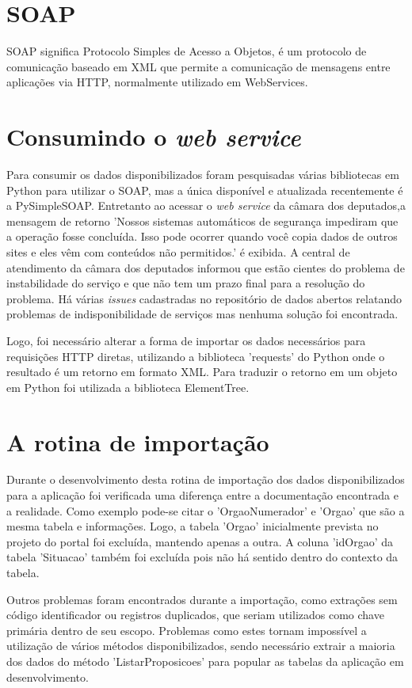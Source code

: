 \documentclass[
	12pt,				%
	openright,			%
	twoside,			%
	a4paper,			%
	english,			%
	french,				%
	spanish,			%
	brazil				%
	]{abntex2}
\begin{document}
\section{SOAP}
SOAP significa Protocolo Simples de Acesso a Objetos, é um protocolo de comunicação baseado em XML que permite a comunicação de mensagens entre aplicações via HTTP, normalmente utilizado em WebServices.

\section{Consumindo o \emph{web service}}
Para consumir os dados disponibilizados foram pesquisadas várias bibliotecas em Python para utilizar o SOAP, mas a única disponível
e atualizada recentemente é a PySimpleSOAP. Entretanto ao acessar o \emph{web service} da câmara dos deputados,a mensagem de retorno 'Nossos sistemas automáticos de segurança impediram que a operação fosse concluída.
Isso pode ocorrer quando você copia dados de outros sites e eles vêm com conteúdos não permitidos.' é exibida. A central de atendimento da câmara dos deputados informou que estão
cientes do problema de instabilidade do serviço e que não tem um prazo final para a resolução do problema. Há várias \emph{issues} cadastradas 
no repositório de dados abertos relatando problemas de indisponibilidade de serviços mas nenhuma solução foi encontrada.

Logo, foi necessário alterar a forma de importar os dados necessários para requisições HTTP diretas, utilizando a biblioteca 'requests' do Python onde o resultado é um retorno em formato XML. Para traduzir
o retorno em um objeto em Python foi utilizada a biblioteca ElementTree.

\section{A rotina de importação}
Durante o desenvolvimento desta rotina de importação dos dados disponibilizados para a aplicação foi verificada 
uma diferença entre a documentação encontrada e a realidade. Como exemplo pode-se citar o 'OrgaoNumerador' e 'Orgao' que são a mesma
tabela e informações. Logo, a tabela 'Orgao' inicialmente prevista no projeto do portal foi excluída, mantendo apenas a outra. A 
coluna 'idOrgao' da tabela 'Situacao' também foi excluída pois não há sentido dentro do contexto da tabela.

Outros problemas foram encontrados durante a importação, como extrações sem código identificador ou registros duplicados, que seriam
utilizados como chave primária dentro de seu escopo. Problemas como estes tornam impossível a utilização
de vários métodos disponibilizados, sendo necessário extrair a maioria dos dados do método 'ListarProposicoes' para popular 
as tabelas da aplicação em desenvolvimento.
\end{document}
